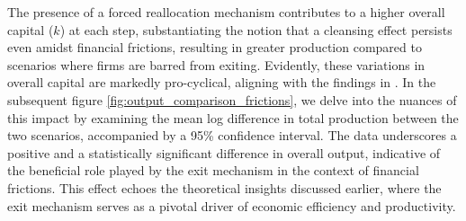 \documentclass[12pt]{report}
\begin{document}
The presence of a forced reallocation mechanism contributes to a higher overall capital (\(k\)) at each step,
substantiating the notion that a cleansing effect persists even amidst financial frictions, resulting in greater
production compared to scenarios where firms are barred from exiting. Evidently, these variations in overall capital are
markedly pro-cyclical, aligning with the findings in \cite{DavHalt92}.
In the subsequent figure \ref{fig:output_comparison_frictions}, we delve into the nuances of this impact by examining the mean log difference in total
production between the two scenarios, accompanied by a 95\% confidence interval.  The data underscores a positive and
a statistically significant difference in overall output, indicative of the beneficial role played by the exit mechanism
in the context of financial frictions. This effect echoes the theoretical insights discussed earlier, where the exit
mechanism serves as a pivotal driver of economic efficiency and productivity.
\end{document}
